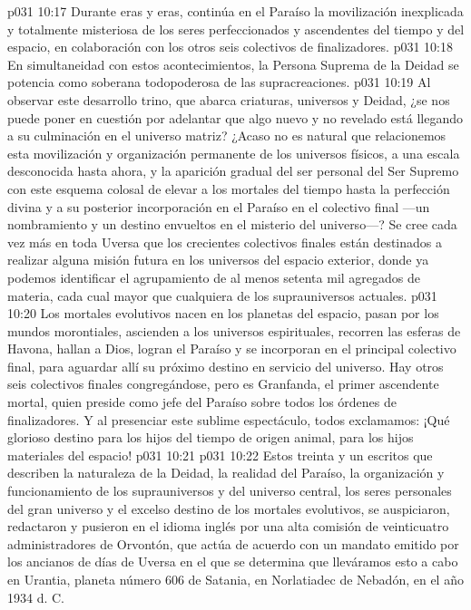 \vs p031 10:17 Durante eras y eras, continúa en el Paraíso la movilización inexplicada y totalmente misteriosa de los seres perfeccionados y ascendentes del tiempo y del espacio, en colaboración con los otros seis colectivos de finalizadores.
\vs p031 10:18 En simultaneidad con estos acontecimientos, la Persona Suprema de la Deidad se potencia como soberana todopoderosa de las supracreaciones.
\vs p031 10:19 \pc Al observar este desarrollo trino, que abarca criaturas, universos y Deidad, ¿se nos puede poner en cuestión por adelantar que algo nuevo y no revelado está llegando a su culminación en el universo matriz? ¿Acaso no es natural que relacionemos esta movilización y organización permanente de los universos físicos, a una escala desconocida hasta ahora, y la aparición gradual del ser personal del Ser Supremo con este esquema colosal de elevar a los mortales del tiempo hasta la perfección divina y a su posterior incorporación en el Paraíso en el colectivo final ---un nombramiento y un destino envueltos en el misterio del universo---? Se cree cada vez más en toda Uversa que los crecientes colectivos finales están destinados a realizar alguna misión futura en los universos del espacio exterior, donde ya podemos identificar el agrupamiento de al menos setenta mil agregados de materia, cada cual mayor que cualquiera de los suprauniversos actuales.
\vs p031 10:20 \pc Los mortales evolutivos nacen en los planetas del espacio, pasan por los mundos morontiales, ascienden a los universos espirituales, recorren las esferas de Havona, hallan a Dios, logran el Paraíso y se incorporan en el principal colectivo final, para aguardar allí su próximo destino en servicio del universo. Hay otros seis colectivos finales congregándose, pero es Granfanda, el primer ascendente mortal, quien preside como jefe del Paraíso sobre todos los órdenes de finalizadores. Y al presenciar este sublime espectáculo, todos exclamamos: ¡Qué glorioso destino para los hijos del tiempo de origen animal, para los hijos materiales del espacio!
\vs p031 10:21 
\separatorline
\vsetoff
\vs p031 10:22 Estos treinta y un escritos que describen la naturaleza de la Deidad, la realidad del Paraíso, la organización y funcionamiento de los suprauniversos y del universo central, los seres personales del gran universo y el excelso destino de los mortales evolutivos, se auspiciaron, redactaron y pusieron en el idioma inglés por una alta comisión de veinticuatro administradores de Orvontón, que actúa de acuerdo con un mandato emitido por los ancianos de días de Uversa en el que se determina que lleváramos esto a cabo en Urantia, planeta número 606 de Satania, en Norlatiadec de Nebadón, en el año 1934 d. C.
